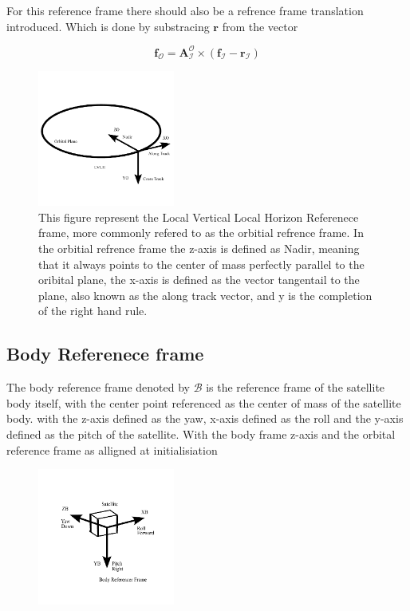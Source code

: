 For this reference frame there should also be a refrence frame translation introduced. Which is done by substracing $\mathbf{r}$ from the vector

\begin{equation}
    \mathbf{f}_{\mathcal{O}} = \mathbf{A}_{\mathcal{I}}^{\mathcal{O}}\times(\mathbf{f}_{\mathcal{I}} - \mathbf{r}_{\mathcal{I}})
\end{equation}

\begin{figure}[H]
    \centering
    \includegraphics[width=0.4\textwidth]{figures/modelling/LVLH.pdf}
    \caption{This figure represent the Local Vertical Local Horizon Referenece frame, more commonly refered to as the orbitial refrence frame. In the orbitial refrence frame
    the z-axis is defined as Nadir, meaning that it always points to the center of mass perfectly parallel to the oribital plane, the x-axis is defined as the vector tangentail
    to the plane, also known as the along track vector, and y is the completion of the right hand rule.}
    \label{fig:LVHLRF}
\end{figure}

\subsection{Body Referenece frame}

The body reference frame denoted by $\mathcal{B}$ is the reference frame of the satellite body itself, with the center point referenced as the center of mass of the satellite body.
with the z-axis defined as the yaw, x-axis defined as the roll and the y-axis defined as the pitch of the satellite. With the body frame z-axis and the orbital reference frame 
as alligned at initialisiation


\begin{figure}[H]
    \centering
    \includegraphics[width=0.4\textwidth]{figures/modelling/BRF.pdf}
    \caption{}
    \label{fig:BRF}
\end{figure}

